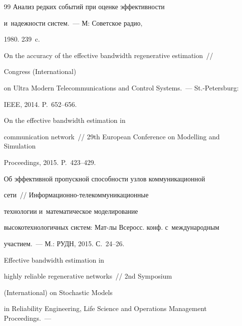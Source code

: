 {{\begin{thebibliography}{99}
 Анализ редких событий при оценке эффективности 


и~надежности систем.~--- М: Советское радио,


1980. 239~c.









On the accuracy of the effective bandwidth regenerative estimation~/\!\!/ 


 Congress (International)


  on Ultra Modern Telecommunications and Control Systems.~--- St.-Petersburg:


  IEEE, 2014.  P.~652--656.







 On the effective bandwidth estimation in 


communication network~/\!\!/ 29th European Conference on Modelling and Simulation 


 Proceedings, 2015. P.~423--429.













 Об эффективной пропускной способности узлов коммуникационной 


сети~/\!\!/  Ин\-фор\-ма\-ци\-он\-но-те\-ле\-ком\-му\-ни\-ка\-ци\-он\-ные  


технологии и~математическое моделирование 


высокотехнологичных систем: Мат-лы Всеросс. конф. с~международным 


участием.~--- М.: РУДН, 2015. С.~24--26.







 Effective bandwidth estimation in 


highly reliable regenerative networks~/\!\!/ 2nd Symposium 


(International) on Stochastic Models 


in Reliability Engineering, Life Science and Operations Management Proceedings.~--- 



\end{thebibliography}}}
